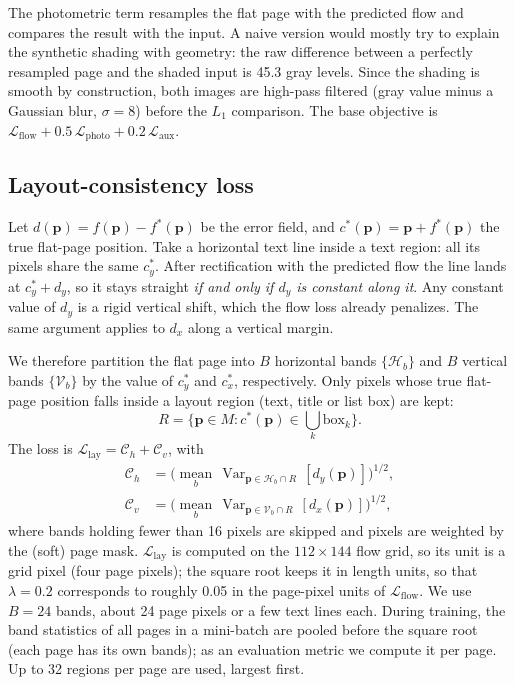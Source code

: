 \documentclass[a4paper,fleqn]{cas-sc}
\newcommand{\Llay}{\mathcal{L}_{\mathrm{lay}}}
\newcommand{\Lflow}{\mathcal{L}_{\mathrm{flow}}}
\newcommand{\Lphoto}{\mathcal{L}_{\mathrm{photo}}}
\newcommand{\Laux}{\mathcal{L}_{\mathrm{aux}}}
\newcommand{\Cm}{\mathcal{C}}
\begin{document}
The photometric term resamples the flat page with the predicted flow and compares the result with the input. A naive version would mostly try to explain the synthetic shading with geometry: the raw difference between a perfectly resampled page and the shaded input is 45.3 gray levels. Since the shading is smooth by construction, both images are high-pass filtered (gray value minus a Gaussian blur, $\sigma=8$) before the $L_1$ comparison. The base objective is $\Lflow + 0.5\,\Lphoto + 0.2\,\Laux$.

\subsection{Layout-consistency loss}
\label{sec:lay}
Let $d(\mathbf{p}) = f(\mathbf{p}) - f^*(\mathbf{p})$ be the error field, and $c^*(\mathbf{p}) = \mathbf{p}+f^*(\mathbf{p})$ the true flat-page position. Take a horizontal text line inside a text region: all its pixels share the same $c^*_y$. After rectification with the predicted flow the line lands at $c^*_y + d_y$, so it stays straight \emph{if and only if $d_y$ is constant along it}. Any constant value of $d_y$ is a rigid vertical shift, which the flow loss already penalizes. The same argument applies to $d_x$ along a vertical margin.

We therefore partition the flat page into $B$ horizontal bands $\{\mathcal{H}_b\}$ and $B$ vertical bands $\{\mathcal{V}_b\}$ by the value of $c^*_y$ and $c^*_x$, respectively. Only pixels whose true flat-page position falls inside a layout region (text, title or list box) are kept:
\begin{equation}
R = \{\mathbf{p} \in M : c^*(\mathbf{p}) \in \textstyle\bigcup_k \mathrm{box}_k\}.
\end{equation}
The loss is $\Llay = \Cm_h + \Cm_v$, with
\begin{equation}
\begin{aligned}
\Cm_h &= \Big(\operatorname*{mean}_{b}\, \operatorname{Var}_{\mathbf{p}\in \mathcal{H}_b\cap R}\,[d_y(\mathbf{p})]\Big)^{1/2},\\
\Cm_v &= \Big(\operatorname*{mean}_{b}\, \operatorname{Var}_{\mathbf{p}\in \mathcal{V}_b\cap R}\,[d_x(\mathbf{p})]\Big)^{1/2},
\end{aligned}
\label{eq:lay}
\end{equation}
where bands holding fewer than 16 pixels are skipped and pixels are weighted by the (soft) page mask. $\Llay$ is computed on the $112\times144$ flow grid, so its unit is a grid pixel (four page pixels); the square root keeps it in length units, so that $\lambda=0.2$ corresponds to roughly 0.05 in the page-pixel units of $\Lflow$. We use $B=24$ bands, about 24 page pixels or a few text lines each. During training, the band statistics of all pages in a mini-batch are pooled before the square root (each page has its own bands); as an evaluation metric we compute it per page. Up to 32 regions per page are used, largest first.
\end{document}
